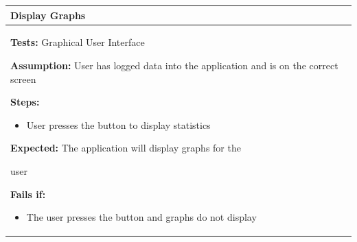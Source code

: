 \documentclass[letterpaper,english, 12pt]{scrreprt}
\begin{document}
\begin{center}
        \begin{tabular}{|C{15cm}|}
                \hline
                        \textbf{Display Graphs}\\
                \hline
                        \begin{flushleft}
                                \textbf{Tests: } Graphical User Interface
                        \end{flushleft}
                        \begin{flushleft}
                                \textbf{Assumption: } User has logged data into the application and is on the correct screen
                        \end{flushleft}
                        \begin{flushleft}
                                \textbf{Steps:}
                        \end{flushleft}
				\begin{itemize}
					\item User presses the button to display statistics
				\end{itemize}
			\begin{flushleft}
				\textbf{Expected: } The application will display graphs for the
			\end{flushleft} user
                        \begin{flushleft}
                                \textbf{Fails if: }
                        \end{flushleft}
                                \begin{itemize}
                                        \item The user presses the button and graphs do not display
                                \end{itemize}
				\\
		\hline
        \end{tabular}
\end{center}
\end{document}
